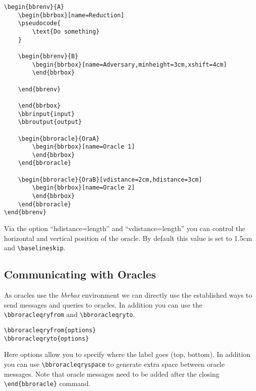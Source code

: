 \documentclass[a4paper]{report}
\begin{document}
\begin{lstlisting}
\begin{bbrenv}{A}
	\begin{bbrbox}[name=Reduction]
	\pseudocode{
		\text{Do something}
	}

	\begin{bbrenv}{B}
		\begin{bbrbox}[name=Adversary,minheight=3cm,xshift=4cm]
		\end{bbrbox}

	\end{bbrenv}

	\end{bbrbox}
	\bbrinput{input}
	\bbroutput{output}

	\begin{bbroracle}{OraA}
		\begin{bbrbox}[name=Oracle 1]
		\end{bbrbox}
	\end{bbroracle}

	\begin{bbroracle}{OraB}[vdistance=2cm,hdistance=3cm]
		\begin{bbrbox}[name=Oracle 2]
		\end{bbrbox}
	\end{bbroracle}
\end{bbrenv}
\end{lstlisting}
Via the option \enquote{hdistance=length} and \enquote{vdistance=length} you can control the horizontal and vertical position of the oracle. By default this value is set to 1.5cm and \lstinline$\baselineskip$.


\subsection{Communicating with Oracles}
As oracles use the \emph{bbrbox} environment we can directly use the established ways to send messages and
queries to oracles. In addition you can use the \lstinline$\bbroracleqryfrom$ and \lstinline$\bbroracleqryto$.
\begin{lstlisting}
\bbroracleqryfrom{options}
\bbroracleqryto{options}
\end{lstlisting}
Here options allow you to specify where the label goes (top, bottom). In addition you can use
\lstinline$\bbroracleqryspace$ to generate extra space between oracle messages. Note
that oracle messages need to be added after the closing \lstinline$\end{bbroracle}$ command.
\end{document}
